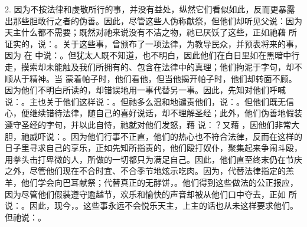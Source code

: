 2. 因为不按法律和虔敬所行的事，并没有益处，纵然它们看似如此，反而更暴露出那些胆敢行之者的伪善。因此，尽管这些人伪称献祭，但他们却听见父说：因为天主什么都不需要；既然对祂来说没有不洁之物，祂已厌饫了这些，正如祂藉  所证实的，说：。关于这些事，曾颁布了一项法律，为教导民众，并预表将来的事，因为  在  中说：。但犹太人既不知道，也不明白，因此他们在白日里如在黑暗中行走，摸索却未能触及我们所拥有的、包含在法律中的真理；他们拘泥于字句，却不顺从于精神。当  蒙着帕子时，他们看他，但当他揭开帕子时，他们却转面不顾。因为他们不明白所读的，却错误地用一事代替另一事。因此，先知对他们呼喊说：。主也关于他们这样说：。但祂多么温和地谴责他们，说：。但他们既无信心，便继续错待法律，随自己的喜好说话，却不理解圣经；此外，他们伪善地假装遵守圣经的字句，并以此自恃，祂就对他们发怒，藉  说：？又藉 ，因他们非常大胆，祂威吓说：。因为他们行事不正直，他们的热心也不符合法律，反而在这样的日子里寻求自己的享乐，正如先知所指责的，他们殴打奴仆，聚集起来争闹斗殴，用拳头击打卑微的人，所做的一切都只为满足自己。因此，他们直至终末仍在节庆之外，尽管他们现在不合时宜、不合季节地炫示吃肉。因为，代替法律指定的羔羊，他们学会向巴耳献祭；代替真正的无酵饼，。他们得到这些做法的公正报应，因为尽管他们假装遵守逾越节，欢乐和愉快的声音却被从他们口中夺去，正如  所说：。因此，现今，。这些事永远不会悦乐天主，上主的话也从未这样要求他们。但祂说：。\par

